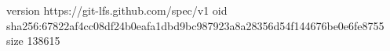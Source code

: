 version https://git-lfs.github.com/spec/v1
oid sha256:67822af4cc08df24b0eafa1dbd9bc987923a8a28356d54f144676be0e6fe8755
size 138615
